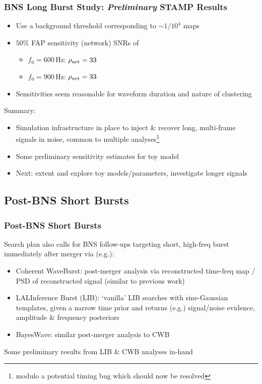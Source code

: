 \documentclass{beamer}
\begin{document}
\begin{frame}
    \frametitle{BNS Long Burst Study: \emph{Preliminary} STAMP Results}
    \begin{itemize}
        \item Use a background threshold corresponding to $\sim1/10^4$ maps
        \item $50\%$ FAP sensitivity (network) SNRs of
            \begin{itemize}
                \item $f_0=600$\,Hz: $\rho_{\rm{net}}=33$
                \item $f_0=900$\,Hz: $\rho_{\rm{net}}=33$
            \end{itemize}
        \item Sensitivities seem reasonable for waveform duration and nature of
            clustering
    \end{itemize}
    Summary:
    \begin{itemize}
        \item Simulation infrastructure in place to inject \& recover long,
            multi-frame signals in noise, common to multiple
            analyses\footnote{modulo a potential timing bug which should now be
            resolved}
        \item Some preliminary sensitivity estimates for toy model
        \item Next: extent and explore toy models/parameters, investigate longer
            signals
    \end{itemize}

\end{frame}

\subsection{Post-BNS Short Bursts}

\begin{frame}
    \frametitle{Post-BNS Short Bursts}
    Search plan also calls for BNS follow-ups targeting short, high-freq burst
    immediately after merger via (e.g.):
    \begin{itemize}
        \item Coherent WaveBurst: post-merger analysis via reconstructed
            time-freq map / PSD of reconstructed signal (similar to previous work)
        \item LALInference Burst (LIB): `vanilla' LIB searches with sine-Gaussian
            templates, given a narrow time prior and returns (e.g.) signal/noise
            evidence, amplitude \& frequency posteriors
        \item BayesWave: similar post-merger analysis to CWB
    \end{itemize}
    Some preliminary results from LIB \& CWB analyses in-hand
\end{frame}
\end{document}
